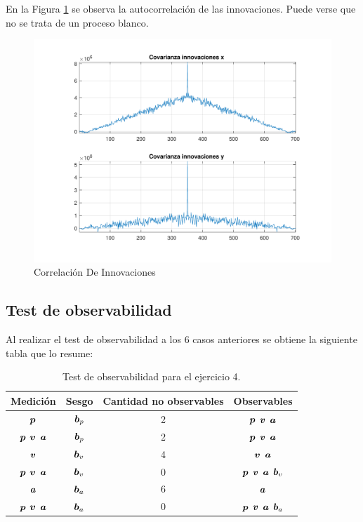 	En la Figura \ref{fig:ej3f_cov} se observa la autocorrelación de las innovaciones. Puede verse que no se trata de un proceso blanco.

	\begin{figure}[H]
		\centering
		\includegraphics[width=1.0\textwidth,keepaspectratio]{Figuras/covinn_ej4f.pdf}
		\caption{Correlación De Innovaciones}
		\label{fig:ej3f_cov}
	\end{figure}
	

	\subsection{Test de observabilidad}

	Al realizar el test de observabilidad a los 6 casos anteriores se obtiene la siguiente tabla que lo resume:

		\begin{table}[h!]
			\centering
			\begin{tabular}{cccc}
				\toprule
				Medición	& Sesgo		& Cantidad no observables	& Observables\\
				\midrule
				$\boldsymbol{p}$	& $\boldsymbol{b}_p$	& 2				& $\boldsymbol{p}$ $\boldsymbol{v}$ $\boldsymbol{a}$\\
				$\boldsymbol{p}$ $\boldsymbol{v}$ $\boldsymbol{a}$	& $\boldsymbol{b}_p$	& 2				& $\boldsymbol{p}$ $\boldsymbol{v}$ $\boldsymbol{a}$\\
				$\boldsymbol{v}$	& $\boldsymbol{b}_v$	& 4				& $\boldsymbol{v}$ $\boldsymbol{a}$ \\
			$\boldsymbol{p}$ $\boldsymbol{v}$ $\boldsymbol{a}$	& $\boldsymbol{b}_v$	& 0				& $\boldsymbol{p}$ $\boldsymbol{v}$ $\boldsymbol{a}$ $\boldsymbol{b}_v$ \\
				$\boldsymbol{a}$	& $\boldsymbol{b}_a$	& 6				& $\boldsymbol{a}$\\
			$\boldsymbol{p}$ $\boldsymbol{v}$ $\boldsymbol{a}$	& $\boldsymbol{b}_a$	& 0				& $\boldsymbol{p}$ $\boldsymbol{v}$ $\boldsymbol{a}$ $\boldsymbol{b}_a$ \\

				\bottomrule
			\end{tabular}
				\caption{Test de observabilidad para el ejercicio 4.}
				\label{tab:obs_ej2}
		\end{table}



